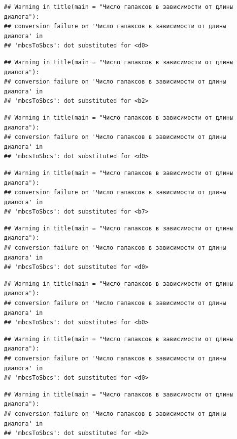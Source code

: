 \documentclass[
]{book}
\theoremstyle{definition}
\theoremstyle{definition}
\theoremstyle{definition}
\theoremstyle{definition}
\theoremstyle{remark}
\begin{document}
\begin{verbatim}
## Warning in title(main = "Число гапаксов в зависимости от длины диалога"):
## conversion failure on 'Число гапаксов в зависимости от длины диалога' in
## 'mbcsToSbcs': dot substituted for <d0>
\end{verbatim}

\begin{verbatim}
## Warning in title(main = "Число гапаксов в зависимости от длины диалога"):
## conversion failure on 'Число гапаксов в зависимости от длины диалога' in
## 'mbcsToSbcs': dot substituted for <b2>
\end{verbatim}

\begin{verbatim}
## Warning in title(main = "Число гапаксов в зависимости от длины диалога"):
## conversion failure on 'Число гапаксов в зависимости от длины диалога' in
## 'mbcsToSbcs': dot substituted for <d0>
\end{verbatim}

\begin{verbatim}
## Warning in title(main = "Число гапаксов в зависимости от длины диалога"):
## conversion failure on 'Число гапаксов в зависимости от длины диалога' in
## 'mbcsToSbcs': dot substituted for <b7>
\end{verbatim}

\begin{verbatim}
## Warning in title(main = "Число гапаксов в зависимости от длины диалога"):
## conversion failure on 'Число гапаксов в зависимости от длины диалога' in
## 'mbcsToSbcs': dot substituted for <d0>
\end{verbatim}

\begin{verbatim}
## Warning in title(main = "Число гапаксов в зависимости от длины диалога"):
## conversion failure on 'Число гапаксов в зависимости от длины диалога' in
## 'mbcsToSbcs': dot substituted for <b0>
\end{verbatim}

\begin{verbatim}
## Warning in title(main = "Число гапаксов в зависимости от длины диалога"):
## conversion failure on 'Число гапаксов в зависимости от длины диалога' in
## 'mbcsToSbcs': dot substituted for <d0>
\end{verbatim}

\begin{verbatim}
## Warning in title(main = "Число гапаксов в зависимости от длины диалога"):
## conversion failure on 'Число гапаксов в зависимости от длины диалога' in
## 'mbcsToSbcs': dot substituted for <b2>
\end{verbatim}
\end{document}
